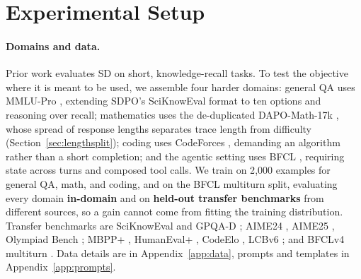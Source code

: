 \documentclass{article}
\begin{document}
\section{Experimental Setup}
\label{sec:setup}
\paragraph{Domains and data.}
Prior work evaluates SD on short, knowledge-recall tasks. To test the objective where it is meant to be used, we assemble four harder domains: general QA uses MMLU-Pro \citep{mmlupro2024}, extending SDPO's SciKnowEval format to ten options and reasoning over recall; mathematics uses the de-duplicated DAPO-Math-17k \citep{dapo2025,dapomathprocessed2025}, whose spread of response lengths separates trace length from difficulty (Section~\ref{sec:lengthsplit}); coding uses CodeForces \citep{codeforcesdata2025}, demanding an algorithm rather than a short completion; and the agentic setting uses BFCL \citep{bfcl2024}, requiring state across turns and composed tool calls. We train on 2{,}000 examples for general QA, math, and coding, and on the BFCL multiturn split, evaluating every domain \textbf{in-domain} and on \textbf{held-out transfer benchmarks} from different sources, so a gain cannot come from fitting the training distribution. Transfer benchmarks are SciKnowEval \citep{sciknoweval2024} and GPQA-D \citep{gpqa2023}; AIME24 \citep{aime2024}, AIME25 \citep{aime2025}, Olympiad Bench \citep{olympiadbench2024}; MBPP+ \citep{mbpp2021}, HumanEval+ \citep{humaneval2021}, CodeElo \citep{codeelo2025}, LCBv6 \citep{lcb2025}; and BFCLv4 multiturn \citep{bfcl2024}. Data details are in Appendix~\ref{app:data}, prompts and templates in Appendix~\ref{app:prompts}.
\end{document}
